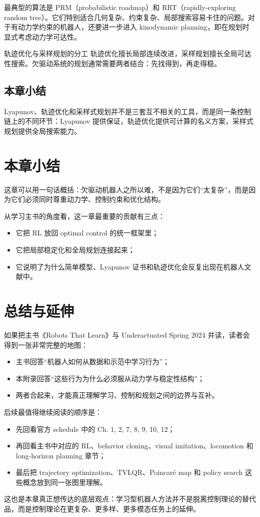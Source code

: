 \documentclass[a4paper]{article}
\begin{document}
最典型的算法是 PRM（probabilistic roadmap）和 RRT（rapidly-exploring random tree）。它们特别适合几何复杂、约束复杂、局部搜索容易卡住的问题。对于有动力学约束的机器人，还要进一步进入 kinodynamic planning，即在规划时显式考虑动力学可达性。

\begin{importantbox}{轨迹优化与采样规划的分工}
轨迹优化擅长局部连续改进，采样规划擅长全局可达性搜索。欠驱动系统的规划通常需要两者结合：先找得到，再走得稳。
\end{importantbox}

\subsection{本章小结}

Lyapunov、轨迹优化和采样式规划并不是三套互不相关的工具，而是同一条控制链上的不同环节：Lyapunov 提供保证，轨迹优化提供可计算的名义方案，采样式规划提供全局搜索能力。

\section{本章小结}

这章可以用一句话概括：欠驱动机器人之所以难，不是因为它们“太复杂”，而是因为它们必须同时尊重动力学、控制约束和优化结构。

从学习主书的角度看，这一章最重要的贡献有三点：
\begin{itemize}
  \item 它把 RL 放回 optimal control 的统一框架里；
  \item 它把局部稳定化和全局规划连接起来；
  \item 它说明了为什么简单模型、Lyapunov 证书和轨迹优化会反复出现在机器人文献中。
\end{itemize}

\section{总结与延伸}

如果把主书《Robots That Learn》与 Underactuated Spring 2024 并读，读者会得到一张非常完整的地图：
\begin{itemize}
  \item 主书回答“机器人如何从数据和示范中学习行为”；
  \item 本附录回答“这些行为为什么必须服从动力学与稳定性结构”；
  \item 两者合起来，才能真正理解学习、控制和规划之间的边界与互补。
\end{itemize}

后续最值得继续阅读的顺序是：
\begin{itemize}
  \item 先回看官方 schedule 中的 Ch. 1, 2, 7, 8, 9, 10, 12；
  \item 再回看主书中对应的 RL、behavior cloning、visual imitation、locomotion 和 long-horizon planning 章节；
  \item 最后把 trajectory optimization、TVLQR、Poincaré map 和 policy search 这些概念放到同一张图里理解。
\end{itemize}

这也是本章真正想传达的底层观点：学习型机器人方法并不是脱离控制理论的替代品，而是控制理论在更复杂、更多样、更多模态任务上的延伸。
\end{document}
